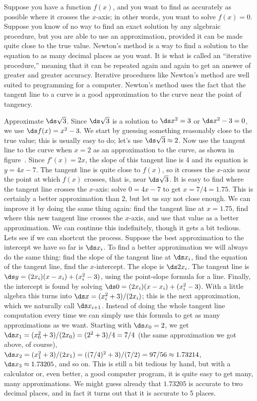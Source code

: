 Suppose you have a function $f(x)$, and you want to find as accurately as
possible where it crosses the $x$-axis; in other words, you want to solve
$f(x)=0$.  Suppose you know of no way to find an exact solution by any
algebraic procedure, but you are able to use an approximation,
provided it can be made quite close to the true value.
Newton's method is a way to find a solution to the
equation to as many decimal places as you want.  It is what is called an
``iterative procedure,'' meaning that it can be repeated again and again to
get an answer of greater and greater accuracy.  Iterative procedures like
Newton's method are well suited to programming for a
computer. Newton's method uses the fact that the tangent line to a
curve is a good approximation to the curve near the point of tangency.

\begin{example} Approximate $\ds \sqrt{3}$. Since $\ds \sqrt{3}$ is a solution to
$\ds x^2=3$ or $\ds x^2-3=0$, we use $\ds f(x)=x^2-3$. We start by guessing
something reasonably close to the true value; this is usually easy to
do; let's use $\ds \sqrt3\approx2$. Now use the tangent line to the curve
when $x=2$ as an approximation to the curve, as shown in
figure~. Since $f'(x)=2x$, the slope of this
tangent line is 4 and its equation is $y=4x-7$. The tangent line is
quite close to $f(x)$, so it crosses the $x$-axis near the point at
which $f(x)$ crosses, that is, near $\ds \sqrt3$. It is easy to find where
the tangent line crosses the $x$-axis: solve $0=4x-7$ to get
$x=7/4=1.75$. This is certainly a better approximation than 2, but let
us say not close enough. We can improve it by doing the same thing
again: find the tangent line at $x=1.75$, find where this new tangent
line crosses the $x$-axis, and use that value as a better
approximation. We can continue this indefinitely, though it gets a bit
tedious. Lets see if we can shortcut the process. Suppose the best
approximation to the intercept we have so far is $\ds x_i$. To find a
better approximation we will always
do the same thing: find the slope of the tangent line at $\ds x_i$, find the
equation of the tangent line, find the $x$-intercept. The slope is
$\ds 2x_i$. The tangent line is $\ds y=(2x_i)(x-x_i)+(x_i^2-3)$, using
the point-slope formula for a line. Finally, the intercept is found by
solving $\ds 0 =(2x_i)(x-x_i)+(x_i^2-3)$. With a little algebra this turns
into $\ds x=(x_i^2+3)/(2x_i)$; this is the next approximation, which we
naturally call $\ds x_{i+1}$. Instead of doing the whole tangent line
computation every time we can simply use this formula to get as many
approximations as we want. Starting with $\ds x_0=2$, we get
$\ds x_1=(x_0^2+3)/(2x_0)=(2^2+3)/4=7/4$ (the same approximation we got
above, of course), $\ds x_2=(x_1^2+3)/(2x_1)=
((7/4)^2+3)/(7/2)=97/56\approx 1.73214$, $\ds x_3\approx 1.73205$, and so
on. This is still a bit tedious by hand, but with a calculator or,
even better, a good computer program, it is quite easy to get many,
many approximations. We might guess already that $1.73205$ is accurate
to two decimal places, and in fact it turns out that it is accurate to
5 places.  \end{example}


